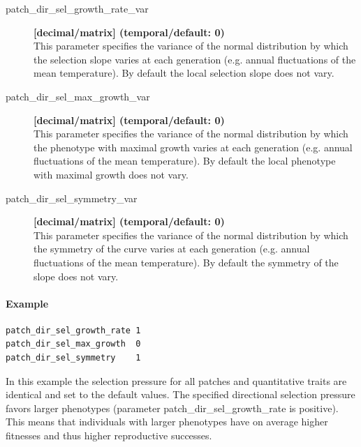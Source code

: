 \documentclass[letterpaper,12pt,oneside]{book}
\begin{document}
\begin{description}
\item[patch\_dir\_sel\_growth\_rate\_var]\textbf{[decimal/matrix] (temporal/default: 0)}\\
This parameter specifies the variance of the normal distribution by which the selection slope varies at each generation (e.g. annual fluctuations of the mean temperature). By default the local selection slope does not vary.

\item[patch\_dir\_sel\_max\_growth\_var]\textbf{[decimal/matrix] (temporal/default: 0)}\\
This parameter specifies the variance of the normal distribution by which the phenotype with maximal growth varies at each generation (e.g. annual fluctuations of the mean temperature). By default the local phenotype with maximal growth does not vary.

\item[patch\_dir\_sel\_symmetry\_var]\textbf{[decimal/matrix] (temporal/default: 0)}\\
This parameter specifies the variance of the normal distribution by which the symmetry of the curve varies at each generation (e.g. annual fluctuations of the mean temperature). By default the symmetry of the slope does not vary.
\end{description}

\paragraph{Example}\hspace*{\fill}
\begin{lstlisting}[frame=single]
patch_dir_sel_growth_rate 1	
patch_dir_sel_max_growth  0	
patch_dir_sel_symmetry    1	
\end{lstlisting}
In this example the selection pressure for all patches and quantitative traits are identical and set to the default values. The specified directional selection pressure favors larger phenotypes (parameter \textsf{patch\_dir\_sel\_growth\_rate} is positive). This means that individuals with larger phenotypes have on average higher fitnesses and thus higher reproductive successes.
\end{document}
